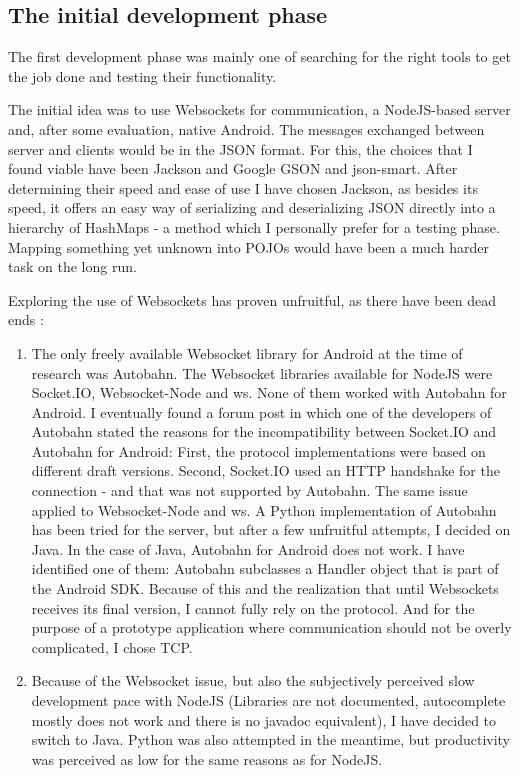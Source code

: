 \documentclass{article}
\begin{document}
\subsection{The initial development phase}

The first development phase was mainly one of searching for the right tools to
get the job done and testing their functionality.\newline

The initial idea was to use Websockets for communication, a NodeJS-based server
and, after some evaluation, native Android. The messages exchanged between
server and clients would be in the JSON format. For this, the choices that I
found viable have been Jackson and Google GSON and json-smart. After determining
their speed and ease of use I have chosen Jackson, as besides its speed, it
offers an easy way of serializing and deserializing JSON directly into a
hierarchy of HashMaps - a method which I personally prefer for a testing phase.
Mapping something yet unknown into POJOs would have been a much harder task on
the long run.\newline

Exploring the use of Websockets has proven unfruitful, as there have been dead
ends :
\begin{enumerate}
  \item The only freely available Websocket library for Android at the time of
  research was Autobahn. The Websocket libraries available for NodeJS were
  Socket.IO, Websocket-Node and ws. None of them worked with Autobahn for
  Android. I eventually found a forum post in which one of the developers of
  Autobahn stated the reasons for the incompatibility between Socket.IO and
  Autobahn for Android: First, the protocol implementations were based on
  different draft versions. Second, Socket.IO used an HTTP handshake for the
  connection - and that was not supported by Autobahn. The same issue applied to
  Websocket-Node and ws. A Python implementation of Autobahn has been tried for
  the server, but after a few unfruitful attempts, I decided on Java. In the
  case of Java, Autobahn for Android does not work. I have identified one of
  them: Autobahn subclasses a Handler object that is part of the Android SDK.
  Because of this and the realization that until Websockets receives its final
  version, I cannot fully rely on the protocol. And for the purpose of a
  prototype application where communication should not be overly complicated, I
  chose TCP.
  
  \item Because of the Websocket issue, but also the subjectively perceived slow
  development pace with NodeJS (Libraries are not documented, autocomplete
  mostly does not work and there is no javadoc equivalent), I have decided to
  switch to Java. Python was also attempted in the meantime, but productivity
  was perceived as low for the same reasons as for NodeJS.  
\end{enumerate}
\end{document}
